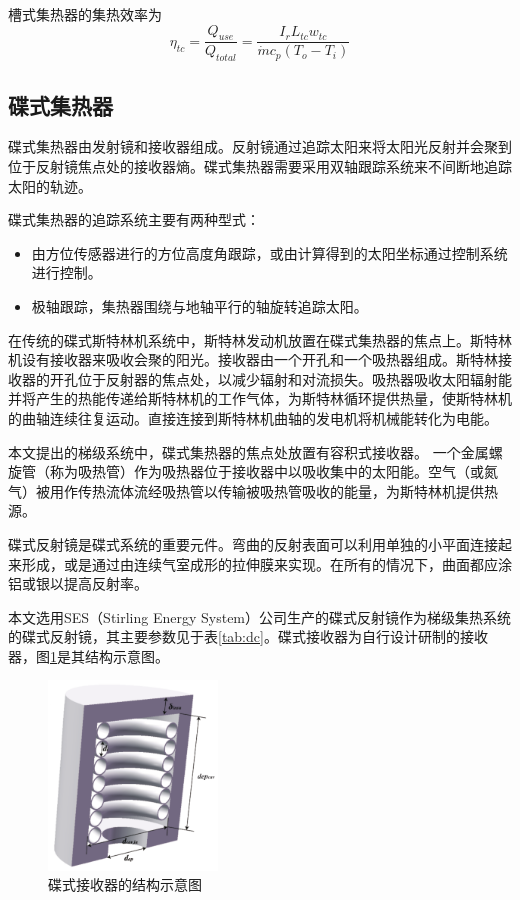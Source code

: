 槽式集热器的集热效率为
\begin{equation}
  \eta_{tc} = \dfrac{Q_{use}}{Q_{total}} = 
  \dfrac{I_r L_{tc} w_{tc}}{\dot{m}c_p(T_o - T_i)}
  \label{eq:eta_tc}
\end{equation}

\subsection{碟式集热器}
\label{sec:pdc}

碟式集热器由发射镜和接收器组成。反射镜通过追踪太阳来将太阳光反射并会聚到位于反射镜焦点处的接收器熵。碟式集热器需要采用双轴跟踪系统来不间断地追踪太阳的轨迹。

碟式集热器的追踪系统主要有两种型式：\cite{Adkins1987}
\begin{itemize}
  \item 由方位传感器进行的方位高度角跟踪，或由计算得到的太阳坐标通过控制系统进行控制。
  \item 极轴跟踪，集热器围绕与地轴平行的轴旋转追踪太阳。
\end{itemize}

在传统的碟式斯特林机系统中，斯特林发动机放置在碟式集热器的焦点上。斯特林机设有接收器来吸收会聚的阳光。接收器由一个开孔和一个吸热器组成。斯特林接收器的开孔位于反射器的焦点处，以减少辐射和对流损失。吸热器吸收太阳辐射能并将产生的热能传递给斯特林机的工作气体，为斯特林循环提供热量，使斯特林机的曲轴连续往复运动。直接连接到斯特林机曲轴的发电机将机械能转化为电能。

本文提出的梯级系统中，碟式集热器的焦点处放置有容积式接收器。 一个金属螺旋管（称为吸热管）作为吸热器位于接收器中以吸收集中的太阳能。空气（或氮气）被用作传热流体流经吸热管以传输被吸热管吸收的能量，为斯特林机提供热源。

碟式反射镜是碟式系统的重要元件。弯曲的反射表面可以利用单独的小平面连接起来形成，或是通过由连续气室成形的拉伸膜来实现。在所有的情况下，曲面都应涂铝或银以提高反射率。

本文选用SES（Stirling Energy System）公司生产的碟式反射镜作为梯级集热系统的碟式反射镜，其主要参数见于表\ref{tab:dc}。碟式接收器为自行设计研制的接收器，图\ref{fig:dishReceiver}是其结构示意图。

\begin{figure}[!ht]
\centering
\includegraphics[width=0.4\textwidth]{fig/DishReceiver.pdf}
\caption{碟式接收器的结构示意图}\label{fig:dishReceiver}
\end{figure}


